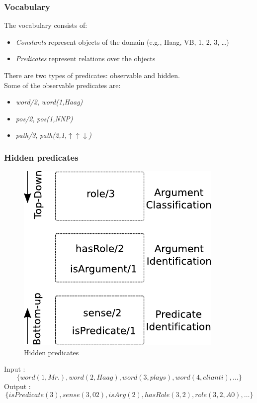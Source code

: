 \documentclass{beamer} \setbeamertemplate{navigation symbols}{}
\begin{document}
\begin{frame}
  \frametitle{Vocabulary}
  The vocabulary consists of:
  \begin{itemize}
  \item \emph{Constants} represent objects of the domain (e.g., Haag,
    VB, 1, 2, 3, \ldots)
  \item \emph{Predicates} represent relations over the objects
  \end{itemize}
  \bigskip There are two types of predicates: observable and
  hidden. \\Some of the observable predicates are:
  \begin{itemize}
  \item \emph{word/2}, \emph{word(1,Haag)}
  \item \emph{pos/2}, \emph{pos(1,NNP)}
  \item \emph{path/3}, \emph{path(2,1,$\uparrow\uparrow\downarrow$)}
  \end{itemize}
    
\end{frame}

\begin{frame}
  \frametitle{Hidden predicates}
  \begin{figure}
    \begin{center}
      \includegraphics[scale=.70]{TaskArchitecture}
    \end{center}
    \caption{Hidden predicates}
    \label{fig:task}
  \end{figure}

  Input : \[\{word(1,Mr.),word(2,Haag), word(3,plays),
  word(4,elianti), \ldots \}\] Output : \[\{isPredicate(3),
  sense(3,02), isArg(2), hasRole(3,2), role(3,2,A0), \ldots \}\]

\end{frame}
\end{document}

